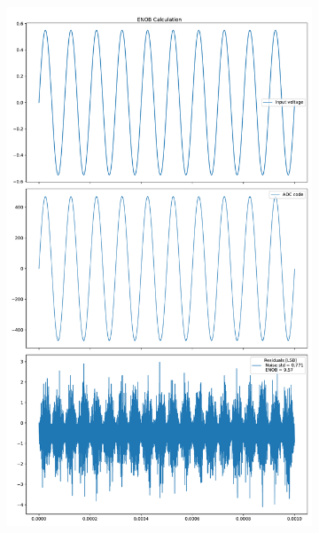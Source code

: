 \documentclass[varwidth]{standalone}
\begin{document}
\begin{figure}
\begin{subfigure}{0.32\textwidth}
    \includegraphics[width=\textwidth]{behavioral_10b_refnoise_enob.pdf}
\end{subfigure}
\begin{subfigure}{0.32\textwidth}
    \begin{table}
    \let\center\empty
    \let\endcenter\relax
    \centering
    \resizebox{0.3\width}{!}{}
    \end{table}

\end{subfigure}
\end{figure}
\end{document}

